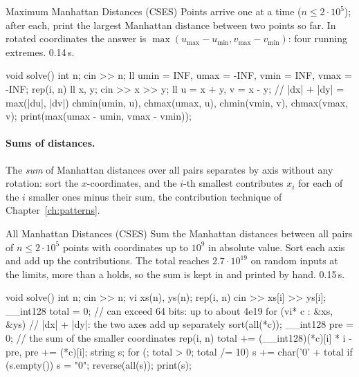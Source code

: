 \begin{problem}{Maximum Manhattan Distances (CSES)}
Points arrive one at a time ($n \le 2 \cdot 10^5$); after each, print the largest Manhattan distance between two points so far.
\solution In rotated coordinates the answer is $\max(u_{\max} - u_{\min}, v_{\max} - v_{\min})$: four running extremes. 0.14\,s.
\end{problem}

\begin{code}
void solve() {
    int n;
    cin >> n;
    ll umin = INF, umax = -INF, vmin = INF, vmax = -INF;
    rep(i, n) {
        ll x, y;
        cin >> x >> y;
        ll u = x + y, v = x - y;  // |dx| + |dy| = max(|du|, |dv|)
        chmin(umin, u), chmax(umax, u), chmin(vmin, v), chmax(vmax, v);
        print(max(umax - umin, vmax - vmin));
    }
}
\end{code}

\paragraph{Sums of distances.} The \emph{sum} of Manhattan distances over all pairs separates by axis without any rotation: sort the
$x$-coordinates, and the $i$-th smallest contributes $x_i$ for each of the $i$ smaller ones minus their sum, the contribution technique of
Chapter~\ref{ch:patterns}.

\begin{problem}{All Manhattan Distances (CSES)}
Sum the Manhattan distances between all pairs of $n \le 2 \cdot 10^5$ points with coordinates up to $10^9$ in absolute value.
\solution Sort each axis and add up the contributions. The total reaches $2.7 \cdot 10^{19}$ on random inputs at the limits, more than a
 holds, so the sum is kept in  and printed by hand. 0.15\,s.
\end{problem}

\begin{code}
void solve() {
    int n;
    cin >> n;
    vi xs(n), ys(n);
    rep(i, n) cin >> xs[i] >> ys[i];
    __int128 total = 0;  // can exceed 64 bits: up to about 4e19
    for (vi* c : {&xs, &ys}) {  // |dx| + |dy|: the two axes add up separately
        sort(all(*c));
        __int128 pre = 0;  // the sum of the smaller coordinates
        rep(i, n) total += (__int128)(*c)[i] * i - pre, pre += (*c)[i];
    }
    string s;
    for (; total > 0; total /= 10) s += char('0' + total %
    if (s.empty()) s = "0";
    reverse(all(s));
    print(s);
}
\end{code}

